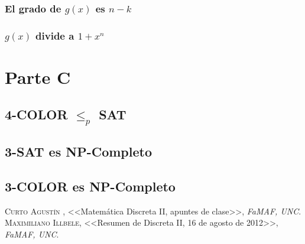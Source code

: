 \documentclass[12pt,a4paper]{report}
\begin{document}
		\subsection{El grado de $g(x)$ es $n-k$}
		
		\subsection{$g(x)$ divide a $1+x^{n}$}
		
		

\chapter{Parte C}

	\section{4-COLOR $\leq_{\textit{p}}$ SAT}
	
	\section{3-SAT es NP-Completo}
	
	\section{3-COLOR es NP-Completo}
	
	
\begin{thebibliography}{X}
 \textsc{Curto Agustín },
<<Matemática Discreta II, apuntes de clase>>,
\textit{FaMAF, UNC}.
 \textsc{Maximiliano Illbele},
<<Resumen de Discreta II, 16 de agosto de 2012>>,
\textit{FaMAF, UNC}.
\end{thebibliography}
\end{document}
